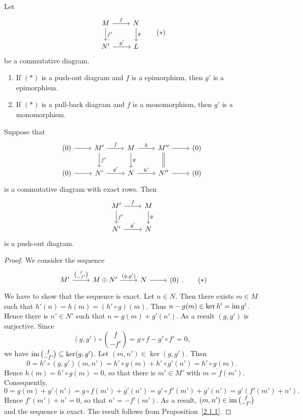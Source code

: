 
\begin{corollary}\label{2.1.4}
Let
\[
\begin{tikzcd}
	M\ar[r,"f"]\ar[d,"f'"] & N\ar[d,"g"] \\
	N'\ar[r,"g'"] & L	
\end{tikzcd}\tag{$*$}
\]
be a commutative diagram.
\begin{enumerate}
\item If $(*)$ is a push-out diagram and $f$ is a epimorphism, then $g'$ is a epimorphism.
\item If $(*)$ is a pull-back diagram and $f$ is a monomorphism, then $g'$ is a monomorphism.
\end{enumerate}
\end{corollary}


\begin{lemma}\label{2.1.5}
Suppose that
\[
  \begin{tikzcd}
    (0) \rar  & M' \ar[d, "f'"] \rar["f"] &  M \ar[d, "g"] \rar["h"] & M'' \ar[d, equal] \rar  & (0) \\
    (0) \rar  & N' \rar["g'"] &  N \rar["h'"] & N'' \rar  & (0)
  \end{tikzcd}
\]
is a commutative diagram with exact rows. Then
\[
  \begin{tikzcd}
	M' \ar[d, "f'"] \rar["f"] &  M \ar[d, "g"] \\
	N' \rar["g'"] &  N
  \end{tikzcd}
\]
is a push-out diagram.
\end{lemma}


\begin{proof}
  We consider the sequence
  \[
    \begin{tikzcd}
      M' \ar[r,"\binom{f}{-f'}"] & M \oplus  N' \rar["{(g,g')}"] & N \rar  & (0)
    \end{tikzcd}.\tag{$*$}
  \]
  We have to show that the sequence is exact. Let $n \in N$. Then there exists $m \in M$ such that $h'(n) = h(m) = (h' \circ g) (m)$. Thus $n - g(m) \in \ker h' = \operatorname{im} g'$.
  Hence there is $n' \in N'$ such that $n = g(m) + g'(n')$. As a result $(g,g')$
  is surjective. Since
\[(g,g') \circ \binom{f}{-f'} = g \circ f - g' \circ f' = 0,\]
 we have $\operatorname{im} \binom{f}{-f'} \subseteq  \ker (g,g')$.
  Let $(m,n') \in \ker (g,g')$. Then
  \[ 0 = h' \circ (g,g')(m,n')
       = h' \circ g(m) + h' \circ g'(n')
       = h' \circ g(m). \]
  Hence  $h(m) = h' \circ g(m) = 0$, so that there is $m' \in M'$ with $m = f(m')$.
  Consequently,
  \[ 0 = g(m) + g'(n') = g\circ f(m') + g'(n')
    = g'\circ f'(m') + g'(n')
    = g'(f'(m') + n').\]
  Hence $f'(m') + n' =0$, so that $n' = -f'(m')$. As a result, $(m,n') \in \operatorname{im}
  \binom{f}{-f'}$ and the sequence is exact. The result follows from Proposition~\ref{2.1.1}.
\end{proof}

